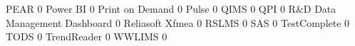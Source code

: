 \documentclass{article}
\begin{document}
\begin{Schunk}
\begin{Soutput}
  PEAR                                                                    0
  Power BI                                                                0
  Print on Demand                                                         0
  Pulse                                                                   0
  QIMS                                                                    0
  QPI                                                                     0
  R&D Data Management Dashboard                                           0
  Reliasoft Xfmea                                                         0
  RSLMS                                                                   0
  SAS                                                                     0
  TestComplete                                                            0
  TODS                                                                    0
  TrendReader                                                             0
  WWLIMS                                                                  0
                                                           

\end{Soutput}
\end{Schunk}
\end{document}
